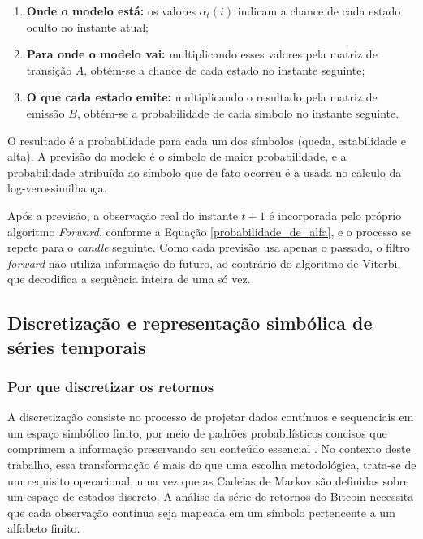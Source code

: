 \documentclass[
    12pt,                %
    openright,           %
    oneside,             %
    a4paper,             %
    english,             %
    brazil               %
]{abntex2}
\begin{document}
\begin{enumerate}
    \item \textbf{Onde o modelo está:} os valores $\alpha_t(i)$ indicam a chance de cada estado oculto no instante atual;
    \item \textbf{Para onde o modelo vai:} multiplicando esses valores pela matriz de transição $A$, obtém-se a chance de cada estado no instante seguinte;
    \item \textbf{O que cada estado emite:} multiplicando o resultado pela matriz de emissão $B$, obtém-se a probabilidade de cada símbolo no instante seguinte.
\end{enumerate}

O resultado é a probabilidade para cada um dos símbolos (queda, estabilidade e alta). A previsão do modelo é o símbolo de maior probabilidade, 
e a probabilidade atribuída ao símbolo que de fato ocorreu é a usada no cálculo da log-verossimilhança.

Após a previsão, a observação real do instante $t+1$ é incorporada pelo próprio algoritmo \textit{Forward}, conforme a Equação \ref{probabilidade_de_alfa}, e o 
processo se repete para o \textit{candle} seguinte. Como cada previsão usa apenas o passado, o filtro \textit{forward} não utiliza informação do futuro, ao 
contrário do algoritmo de Viterbi, que decodifica a sequência inteira de uma só vez.

\subsection{Discretização e representação simbólica de séries temporais}

\subsubsection{Por que discretizar os retornos}

A discretização consiste no processo de projetar dados contínuos e sequenciais 
em um espaço simbólico finito, por meio de padrões probabilísticos concisos que 
comprimem a informação preservando seu conteúdo essencial \cite{Jha2021_arxiv}. No contexto 
deste trabalho, essa transformação é mais do que uma escolha metodológica, trata-se
de um requisito operacional, uma vez que as Cadeias de Markov são definidas sobre um espaço de estados discreto.
A análise da série de retornos do Bitcoin necessita que cada observação contínua seja 
mapeada em um símbolo pertencente a um alfabeto finito.
\end{document}
